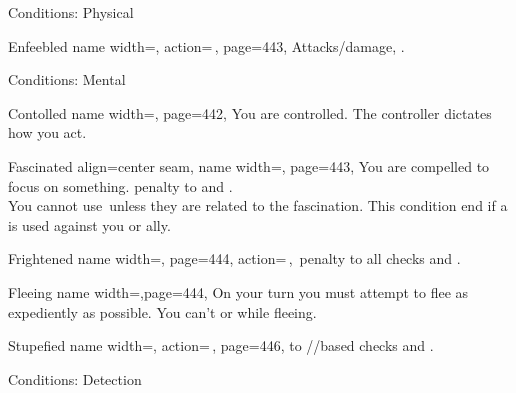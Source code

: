 \begin{PageFront}
\begin{Tables}{\frontTableHeight}
\begin{Table}{Conditions: Physical}
\begin{entry}{Enfeebled}{%
                name width=\conditionLength,%
                action=\,\X,
                page=443,
            }
{                Attacks/damage, \Athletics.}
            \end{entry}
        \end{Table}
        \TableSpace
        \begin{Table}{Conditions: Mental}
            \begin{entry}{Contolled}{%
                name width=\conditionLength,%
                page=442,
            }
                You are controlled. The controller dictates how you act.\hfill {}
            \end{entry}
            \begin{entry}{Fascinated}{%
                align=center seam,
                name width=\conditionLength,
                page=443,
            }
                You are compelled to focus on something.  \Cirm penalty to \PerceptionT and . \\You cannot use \Concentrate\,unless they are related to the fascination. \hfill This
                condition end if a  is used against you or ally.
            \end{entry}
            \begin{entry}{Frightened}{%
                name width=\conditionLength,%
                page=444,
                action=\,\X,
            }
                \Numb{-\X}\,\Cirm penalty to all checks and \DCs. \hfill {}
            \end{entry}
            \begin{entry}{Fleeing}{%
                name width=\conditionLength,page=444,
            }
                On your turn you must attempt to flee as expediently as possible. \hfill You can't  or  while fleeing.
            \end{entry}
            \begin{entry}{Stupefied}{%
                name width=\conditionLength,%
                action=\,\X,
                page=446,
            }
                \Numb{-\X} \Status to \Intellegence\!/\Wisdom\!/\Charisma based checks and \DCs. \hfill {} \Flat[][val=5+\X] 
            \end{entry}
        \end{Table}
        \TableSpace
        \begin{Table}{Conditions: Detection}

\end{Table}
\end{Tables}
\end{PageFront}
